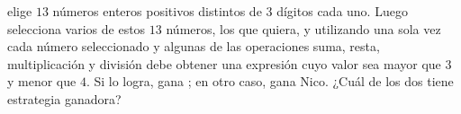  elige $13$ números enteros positivos distintos de $3$ dígitos cada uno.
Luego  selecciona varios de estos $13$ números, los que quiera, y utilizando una sola vez cada número seleccionado y algunas de las operaciones suma, resta, multiplicación y división debe obtener una expresión cuyo valor sea mayor que $3$ y menor que $4$. Si lo logra, gana ; en otro caso, gana Nico. ¿Cuál de los dos tiene estrategia ganadora?
